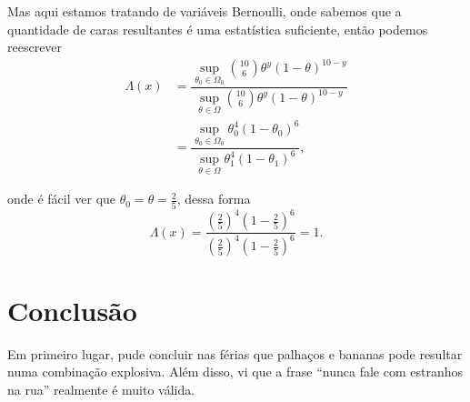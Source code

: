 \documentclass{article}
\begin{document}
Mas aqui estamos tratando de variáveis Bernoulli, onde sabemos que a quantidade de caras resultantes é uma estatística suficiente, então podemos reescrever
\begin{equation*}
    \begin{split}
        \Lambda(x) & = \dfrac{\sup_{\theta_0 \in \Omega_0} \binom{10}{6} \theta^y(1 - \theta)^{10 - y}}{\sup_{\theta \in \Omega} \binom{10}{6} \theta^y(1 - \theta)^{10 - y}} \\
        & = \dfrac{\sup_{\theta_0 \in \Omega_0} \theta_0^4(1 - \theta_0)^6}{\sup_{\theta \in \Omega} \theta_1^4(1 - \theta_1)^6},
    \end{split}
\end{equation*}

\noindent onde é fácil ver que $\theta_0 = \theta = \frac{2}{5}$, dessa forma
\[\Lambda(x) = \dfrac{\left(\frac{2}{5}\right)^4\left(1 - \frac{2}{5}\right)^6}{\left(\frac{2}{5}\right)^4\left(1 - \frac{2}{5}\right)^6} = 1.\]




















\section*{Conclusão}

Em primeiro lugar, pude concluir nas férias que palhaços e bananas pode resultar numa combinação explosiva. Além disso, vi que a frase ``nunca fale com estranhos na rua'' realmente é muito válida.
\end{document}
